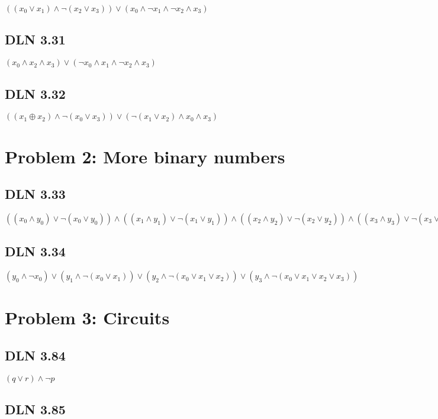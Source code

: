 \documentclass[titlepage]{article}
\begin{document}
\(((x_0\lor x_1)\land \lnot(x_2\lor x_3)) \lor (x_0 \land \lnot x_1 \land \lnot x_2 \land x_3)\)

\subsection{DLN 3.31} 

\((x_0 \land x_2 \land x_3) \lor (\lnot x_0 \land x_1 \land \lnot x_2 \land x_3)\)

\subsection{DLN 3.32} 

\(((x_1 \oplus x_2) \land \lnot(x_0 \lor x_3)) \lor  (\lnot(x_1 \lor x_2) \land x_0 \land x_3)\)


\section{Problem 2: More binary numbers}

\subsection{DLN 3.33} 

\( ((x_0 \land y_0) \lor \lnot(x_0 \lor y_0)) \land ((x_1 \land y_1) \lor \lnot(x_1 \lor y_1)) \land ((x_2 \land y_2) \lor \lnot(x_2\lor y_2)) \land ((x_3 \land y_3) \lor \lnot(x_3 \lor y_3))    \)

\subsection{DLN 3.34} 

\( (y_0 \land \lnot x_0) \lor (y_1 \land \lnot(x_0 \lor x_1)) \lor (y_2 \land \lnot(x_0 \lor x_1 \lor x_2)) \lor (y_3 \land \lnot(x_0 \lor x_1 \lor x_2 \lor x_3))    \)

\section{Problem 3: Circuits}

\subsection{DLN 3.84} 

\( (q \lor r) \land \lnot p \)

\subsection{DLN 3.85} 
\end{document}
